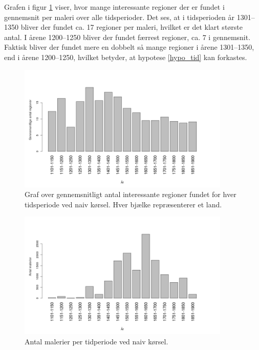 {Grafen i figur \ref{naiv_year} viser, hvor mange interessante regioner
der er fundet i gennemsnit per maleri over alle tidsperioder. Det ses,
at i tidsperioden år 1301--1350 bliver der fundet ca. 17 regioner per
maleri, hvilket er det klart største antal. I årene 1200--1250 bliver
der fundet færrest regioner, ca. 7 i gennemsnit. Faktisk bliver der
fundet mere en dobbelt så mange regioner i årene 1301--1350, end i årene
1200--1250, hvilket betyder, at hypotese \ref{hypo_tid} kan forkastes.

\begin{figure}[!h]
	\centering
	\includegraphics[angle=0,width=0.90\textwidth]{afsnit/resultater/billeder/yearcut.png}
    \caption{Graf over gennemsnitligt antal interessante regioner fundet
    for hver tidsperiode ved naiv kørsel. Hver bjælke repræsenterer et
    land.}
	\label{naiv_year}
\end{figure}

\begin{figure}[!h]
	\centering
	\includegraphics[angle=0,width=0.90\textwidth]{afsnit/resultater/billeder/yearNrImage.png}
	\caption{Antal malerier per tidperiode ved naiv kørsel.}
	\label{naiv_yearNrImage}
\end{figure}

}
